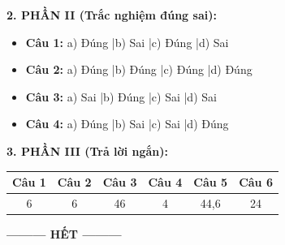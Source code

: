 \documentclass[12pt,a4paper]{article}
\begin{document}
\noindent
\textbf{2. PHẦN II (Trắc nghiệm đúng sai):}
\begin{itemize}
	\item \textbf{Câu 1:} a) Đúng \quad|\quad b) Sai \quad|\quad c) Đúng \quad|\quad d) Sai
	\item \textbf{Câu 2:} a) Đúng \quad|\quad b) Đúng \quad|\quad c) Đúng \quad|\quad d) Đúng
	\item \textbf{Câu 3:} a) Sai \quad|\quad b) Đúng \quad|\quad c) Sai \quad|\quad d) Sai
	\item \textbf{Câu 4:} a) Đúng \quad|\quad b) Sai \quad|\quad c) Sai \quad|\quad d) Đúng
\end{itemize}

\noindent
\textbf{3. PHẦN III (Trả lời ngắn):}
\begin{center}
\begin{tabular}{|c|c|c|c|c|c|}
\hline
\textbf{Câu 1} & \textbf{Câu 2} & \textbf{Câu 3} & \textbf{Câu 4} & \textbf{Câu 5} & \textbf{Câu 6} \\ \hline
6 & 6 & 46 & 4 & 44,6 & 24 \\ \hline
\end{tabular}
\end{center}

\begin{center}
\textbf{--------- HẾT ---------}
\end{center}
\end{document}
